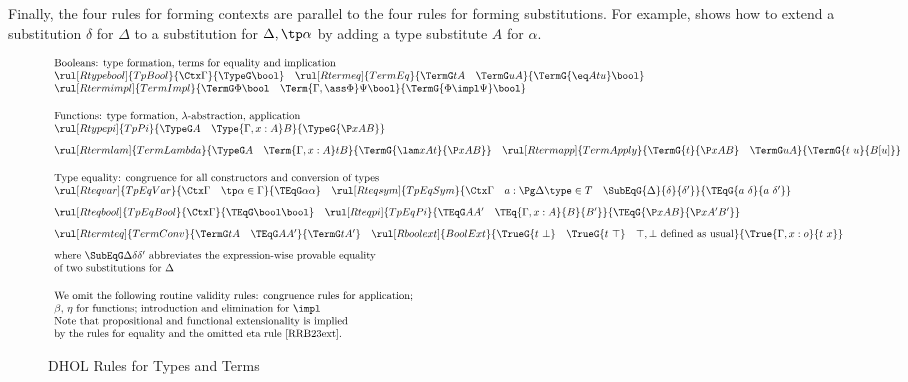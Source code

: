 Finally, the four rules for forming contexts are parallel to the four rules for forming substitutions.
For example, \Rsubtype shows how to extend a substitution $\delta$ for $\Delta$ to a substitution for $\Delta,\tp\alpha$ by adding a type substitute $A$ for $\alpha$.

\begin{figure}[htbp]
\[\begin{array}{l}
\text{Booleans: type formation, terms for equality and implication}\\
   \rul[Rtypebool]{TpBool}{\Ctx\Gamma}{\TypeG \bool} \quad
   \rul[Rtermeq]{TermEq}{\TermG tA \quad \TermG uA}{\TermG{\eq Atu}\bool}\\%
   \rul[Rtermimpl]{TermImpl}{\TermG \Phi\bool \quad \Term{\Gamma,\ass \Phi}\Psi\bool}{\TermG{\Phi\impl\Psi}\bool}\\[0.5cm]
\text{Functions: type formation, $\lambda$-abstraction, application}\\
   \rul[Rtypepi]{TpPi}{\TypeG A \quad \Type{\Gamma,x:A}B }{\TypeG {\P xAB}}\\[.3cm]
   \rul[Rtermlam]{TermLambda}{\TypeG A \quad \Term{\Gamma,x:A}t B}{\TermG{\lam xAt}{\P xAB}}\quad
   \rul[Rtermapp]{TermApply}{\TermG{t}{\P xAB} \quad \TermG uA}{\TermG{t\ u}{B[u]}}\\[0.5cm]
\text{Type equality: congruence for all constructors and conversion of types}\\
   \rul[Rteqvar]{TpEqVar}{\Ctx \Gamma \quad \tp\alpha\in \Gamma}{\TEqG \alpha\alpha}\quad
   \rul[Rteqsym]{TpEqSym}{\Ctx \Gamma \quad a:\Pg\Delta \type \in T \quad \SubEqG{\Delta}{\delta}{\delta'}}{\TEqG{a\ \delta}{a\ \delta'}}\\[.3cm]
   \rul[Rteqbool]{TpEqBool}{\Ctx \Gamma}{\TEqG \bool\bool}\quad
   \rul[Rteqpi]{TpEqPi}{\TEqG A {A'}\quad \TEq{\Gamma,x:A}{B}{B'}}{\TEqG{\P xAB}{\P x{A'}{B'}}}\\[.3cm]
  \rul[Rtermteq]{TermConv}{\TermG tA \quad \TEqG A{A'}}{\TermG t{A'}}\quad
  \rul[Rboolext]{BoolExt}{\TrueG{t\ \bot} \quad \TrueG{t\ \top} \quad \top,\bot\text{ defined as usual}}{\True{\Gamma, x:o}{t\ x}} \\[.3cm]
     \text{where $\SubEqG \Delta\delta{\delta'}$ abbreviates the expression-wise provable equality}\\
  \text{of two substitutions for $\Delta$}\\[.5cm]  
\text{We omit the following routine validity rules: congruence rules for application;}\\
  \text{$\beta$, $\eta$ for functions; introduction and elimination for $\impl$}\\
  \text{Note that propositional and functional extensionality is implied}\\
  \text{by the rules for equality and the omitted eta rule~\cite{RRB23ext}.}
\end{array}
\]
\caption{DHOL Rules for Types and Terms}\label{fig:exprules}
\end{figure}

